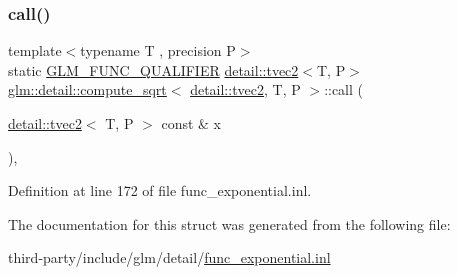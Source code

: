 \subsubsection{\texorpdfstring{call()}{call()}}
{\footnotesize\ttfamily template$<$typename T , precision P$>$ \\
static \hyperlink{setup_8hpp_a33fdea6f91c5f834105f7415e2a64407}{G\+L\+M\+\_\+\+F\+U\+N\+C\+\_\+\+Q\+U\+A\+L\+I\+F\+I\+ER} \hyperlink{structglm_1_1detail_1_1tvec2}{detail\+::tvec2}$<$T, P$>$ \hyperlink{structglm_1_1detail_1_1compute__sqrt}{glm\+::detail\+::compute\+\_\+sqrt}$<$ \hyperlink{structglm_1_1detail_1_1tvec2}{detail\+::tvec2}, T, P $>$\+::call (\begin{DoxyParamCaption}\item[{\hyperlink{structglm_1_1detail_1_1tvec2}{detail\+::tvec2}$<$ T, P $>$ const \&}]{x }\end{DoxyParamCaption})\hspace{0.3cm}{\ttfamily [inline]}, {\ttfamily [static]}}



Definition at line 172 of file func\+\_\+exponential.\+inl.



The documentation for this struct was generated from the following file\+:\begin{DoxyCompactItemize}
\item 
third-\/party/include/glm/detail/\hyperlink{func__exponential_8inl}{func\+\_\+exponential.\+inl}\end{DoxyCompactItemize}
